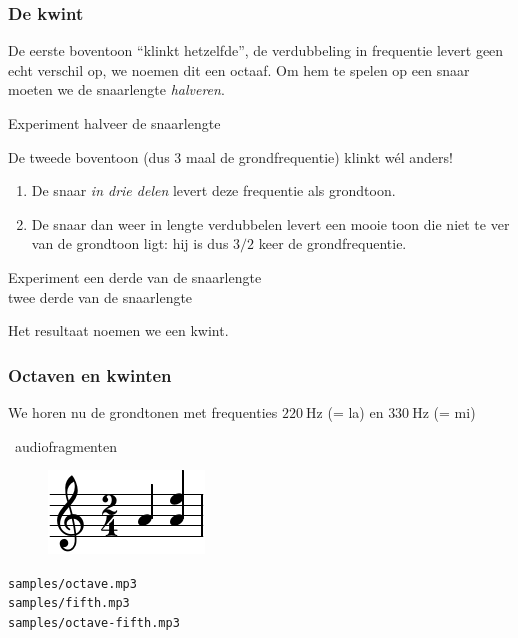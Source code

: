 \documentclass[compress, darktitle, framenumber, totalframenumber]{beamer}
\begin{document}
\begin{frame}
  \frametitle{De kwint}

  De \alert{eerste boventoon} ``klinkt hetzelfde'', de verdubbeling in frequentie levert geen echt verschil op, we noemen dit een \alert{octaaf}.
  \pause
  Om hem te spelen op een snaar moeten we de snaarlengte \emph{halveren}.
  \begin{block}{Experiment}
    halveer de snaarlengte
  \end{block}

  \pause

  De \alert{tweede boventoon} (dus 3 maal de grondfrequentie) klinkt w\'el anders!

  \begin{enumerate}
    \item De snaar \emph{in drie delen} levert deze frequentie als grondtoon.
    \item \pause De snaar dan weer in lengte verdubbelen levert een mooie toon die niet te ver van de grondtoon ligt: hij is dus $3/2$ keer de grondfrequentie.
  \end{enumerate}
  \begin{block}{Experiment}
    een derde van de snaarlengte \\
    twee derde van de snaarlengte
  \end{block}
  \pause
  Het resultaat noemen we een \alert{kwint}.
\end{frame}

\begin{frame}
  \frametitle{Octaven en kwinten}

  We horen nu de grondtonen met frequenties $\SI{220}{\hertz}$ (= la) en $\SI{330}{\hertz}$ (= mi)
  \begin{block}{\twonotes\ audiofragmenten}
    \begin{figure}
      \vspace{-.5cm} %
      \centering
      \includegraphics{scores/fifths-cropped}
    \end{figure}

    \texttt{samples/octave.mp3} \\
    \texttt{samples/fifth.mp3} \\
    \texttt{samples/octave-fifth.mp3}
  \end{block}
\end{frame}
\end{document}
